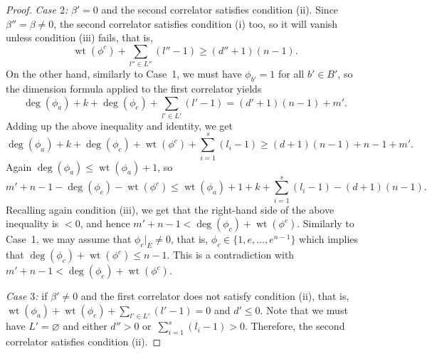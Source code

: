 \documentclass[10pt,a4paper]{article}
\numberwithin{equation}{section}
\begin{document}
\begin{proof}
{\em Case $2$:} $\beta'=0$ and the second correlator satisfies condition (ii). Since $\beta''=\beta\neq 0$, the second correlator satisfies condition (i) too, so it will vanish unless condition (iii) fails, that is,
\[
\operatorname{wt}(\phi^c)+\sum_{l''\in L''} (l''-1) \geq (d''+1)(n-1).
\]
On the other hand, similarly to Case~1, we must have $\phi_{b'}=1$ for all $b'\in B'$, so the dimension formula applied to the first correlator yields
\[
\operatorname{deg}(\phi_a)+k + \operatorname{deg}(\phi_c)+
\sum_{l'\in L'} (l'-1) = (d'+1) (n-1) +m'.
\]
Adding up the above inequality and identity, we get
\[
\operatorname{deg}(\phi_a)+k + \operatorname{deg}(\phi_c)+
\operatorname{wt}(\phi^c)+
\sum_{i=1}^s (l_i-1) \geq (d+1)(n-1) +n-1+m'.
\]
Again $\operatorname{deg}(\phi_a)\leq \operatorname{wt}(\phi_a)+1$, so
\[
m'+n-1 - \operatorname{deg}(\phi_c)-\operatorname{wt}(\phi^c)\leq
\operatorname{wt}(\phi_a)+1+k +\sum_{i=1}^s (l_i-1) -(d+1)(n-1).
\]
Recalling again condition (iii), we get that the right-hand side of the above inequality is $<0$, and hence
$m'+n-1 < \operatorname{deg}(\phi_c)+\operatorname{wt}(\phi^c). $
Similarly to Case~1, we may assume that $\phi_c|_E\neq 0$, that is, $\phi_c\in \big\{ 1, e, \dots, e^{n-1}\big\}$ which implies that $\operatorname{deg}(\phi_c)+\operatorname{wt}(\phi^c)\leq n-1$. This is a contradiction with
$
m'+n-1 < \operatorname{deg}(\phi_c)+\operatorname{wt}(\phi^c)$.

{\em Case $3$:} if $\beta'\neq 0$ and the first correlator does not satisfy condition (ii), that is,
$\operatorname{wt}(\phi_a)+\operatorname{wt}(\phi_c) +\sum_{l'\in L'} (l'-1) =0$ and $d'\leq 0$. Note that we must have $L'=\varnothing$ and either $d''>0$ or~${\sum_{i=1}^s (l_i-1)>0}$. Therefore, the second correlator satisfies condition (ii).


\end{proof}
\end{document}
